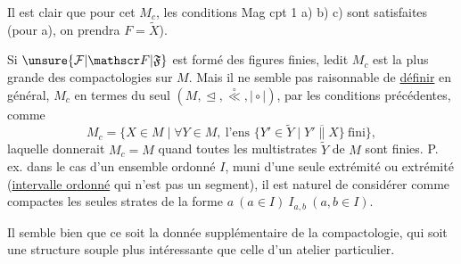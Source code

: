 Il est clair que pour cet $M_c$, les conditions Mag cpt 1 a) b) c) sont satisfaites (pour a), on prendra $F=\widetilde X$).

 Si $\unsure{\mathcal F|\mathscr F|\mathfrak F}$ est formé des figures finies, ledit $M_c$ est  la plus grande des compactologies sur $M$. Mais il ne semble pas raisonnable de \uline{définir} en général, $M_c$ en termes du seul  $(M,\trianglelefteq,\overset{\circ}{\ll},\mathrel{\mid\circ\mid})$, par les conditions précédentes, comme 
\[
M_c=\{X\in M\mid\forall Y\in M,\ \text{l'ens }\{Y'\in\widetilde Y\mid Y'\mathrel{\overline{\parallel}}X\}\ \text{fini}\},
\]
laquelle donnerait $M_c=M$ quand toutes les multistrates  $\widetilde Y$ de $M$ sont finies. P. ex. dans le cas d'un ensemble ordonné $I$, muni d'une seule extrémité ou  extrémité (\uline{intervalle ordonné} qui n'est pas un segment), il est naturel de considérer comme compactes les seules strates de la forme $a\ (a\in I)\ I_{a,b}\ (a,b\in I)$.

Il semble bien que ce soit la donnée supplémentaire de la compactologie, qui soit une structure souple plus intéressante que celle d'un atelier  particulier.
